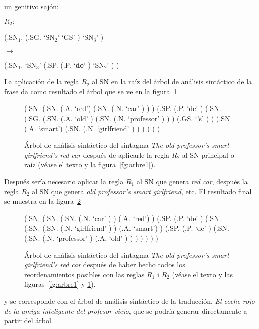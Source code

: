 un genitivo sajón: \begin{center} $R_2:$ \begin{parsetree} (.SN$_1$. (.SG. `SN$_2$' `GS' ) `SN$_3$' ) \end{parsetree} $\longrightarrow$ \begin{parsetree} (.SN$_1$. `SN$_3$' (.SP. (.P. `\textbf{de}' ) `SN$_2$' ) ) \end{parsetree} \end{center} La aplicación de la regla $R_2$ al $\mathrm{SN}$ en la raíz del árbol de análisis sintáctico de la frase da como resultado el árbol que se ve en la figura~\ref{fg:arbre2}. \begin{figure} \begin{center} \begin{parsetree} (.SN. (.SN. (.A. `red') (.SN. (.N. `car' ) ) ) (.SP. (.P. `de' ) (.SN. (.SG. (.SN. (.A. `old' ) (.SN. (.N. `professor' ) ) ) (.GS. `{'s}' ) ) (.SN. (.A. `smart') (.SN. (.N. `girlfriend' ) ) ) ) ) ) \end{parsetree} \end{center} \caption{Árbol de análisis sintáctico del sintagma \emph{The old professor's smart girlfriend's red car} después de aplicarle la regla $R_2$ al $\mathrm{SN}$ principal o raíz (véase el texto y la figura~\protect\ref{fg:arbre1}).} \label{fg:arbre2} \end{figure} Después sería necesario aplicar la regla $R_1$ al $\mathrm{SN}$ que genera \emph{red car}, después la regla $R_2$ al $\mathrm{SN}$ que genera \emph{old professor's smart girlfriend}, etc. El resultado final se muestra en la figura~\ref{fg:arbre3} \begin{figure} \begin{center} \begin{parsetree} (.SN. (.SN. (.SN. (.N. `car' ) ) (.A. `red') ) (.SP. (.P. `de' ) (.SN. (.SN. (.SN. (.N. `girlfriend' ) ) (.A. `smart') ) (.SP. (.P. `de' ) (.SN. (.SN. (.N. `professor' ) (.A. `old' ) ) ) ) ) ) ) \end{parsetree} \end{center} \caption{Árbol de análisis sintáctico del sintagma \emph{The old professor's smart girlfriend's red car} después de haber hecho todos los reordenamientos posibles con las reglas $R_1$ i $R_2$ (véase el texto y las figuras~\protect\ref{fg:arbre1} y \protect\ref{fg:arbre2}).} \label{fg:arbre3} \end{figure} y se corresponde con el árbol de análisis sintáctico de la traducción, \emph{El coche rojo de la amiga inteligente del profesor viejo}, que se podría generar directamente a partir del árbol. 

